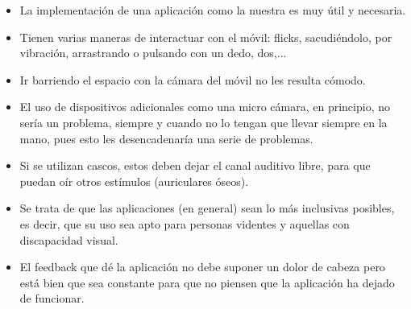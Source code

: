 \documentclass{article}
\begin{document}
	\begin{itemize}
		\item La implementación de una aplicación como la nuestra es muy útil y necesaria.
		\item Tienen varias maneras de interactuar con el móvil: flicks, sacudiéndolo, por vibración, arrastrando o pulsando con un dedo, dos,...
		\item Ir barriendo el espacio con la cámara del móvil no les resulta cómodo.
		\item El uso de dispositivos adicionales como una micro cámara, en principio, no sería un problema, siempre y cuando no lo tengan que llevar siempre en la mano, pues esto les desencadenaría una serie de problemas.
		\item Si se utilizan cascos, estos deben dejar el canal auditivo libre, para que puedan oír otros estímulos (auriculares óseos).
		\item Se trata de que las aplicaciones (en general) sean lo más inclusivas posibles, es decir, que su uso sea apto para personas videntes y aquellas con discapacidad visual.
		\item El feedback que dé la aplicación no debe suponer un dolor de cabeza pero está bien que sea constante para que no piensen que la aplicación ha dejado de funcionar.
	\end{itemize}
\end{document}
